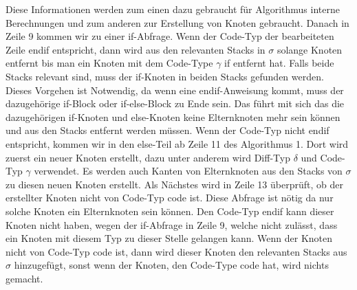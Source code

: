 Diese Informationen werden zum einen dazu gebraucht für Algorithmus interne Berechnungen und zum anderen zur Erstellung von Knoten gebraucht. Danach in Zeile 9 kommen wir zu einer if-Abfrage. Wenn der Code-Typ der bearbeiteten Zeile endif entspricht, dann wird aus den relevanten Stacks in $\sigma$ solange Knoten entfernt bis man ein Knoten mit dem Code-Type $\gamma$ if entfernt hat. Falls beide Stacks relevant sind, muss der if-Knoten in beiden Stacks gefunden werden. Dieses Vorgehen ist Notwendig, da wenn eine endif-Anweisung kommt, muss der dazugehörige if-Block oder if-else-Block zu Ende sein. Das führt mit sich das die dazugehörigen if-Knoten und else-Knoten keine Elternknoten mehr sein können und aus den Stacks entfernt werden müssen. Wenn der Code-Typ nicht endif entspricht, kommen wir in den else-Teil ab Zeile 11 des Algorithmus 1. Dort wird zuerst ein neuer Knoten erstellt, dazu unter anderem wird Diff-Typ $\delta$ und Code-Typ $\gamma$ verwendet. Es werden auch Kanten von Elternknoten aus den Stacks von $\sigma$ zu diesen neuen Knoten erstellt. Als Nächstes wird in Zeile 13 überprüft, ob der erstellter Knoten nicht von Code-Typ code ist. Diese Abfrage ist nötig da nur solche Knoten ein Elternknoten sein können. Den Code-Typ endif kann dieser Knoten nicht haben, wegen der if-Abfrage in Zeile 9, welche nicht zulässt, dass ein Knoten mit diesem Typ zu dieser Stelle gelangen kann.  Wenn der Knoten nicht von Code-Typ code ist, dann wird dieser Knoten den relevanten Stacks aus $\sigma$ hinzugefügt, sonst wenn der Knoten, den Code-Type code hat, wird nichts gemacht.\\


